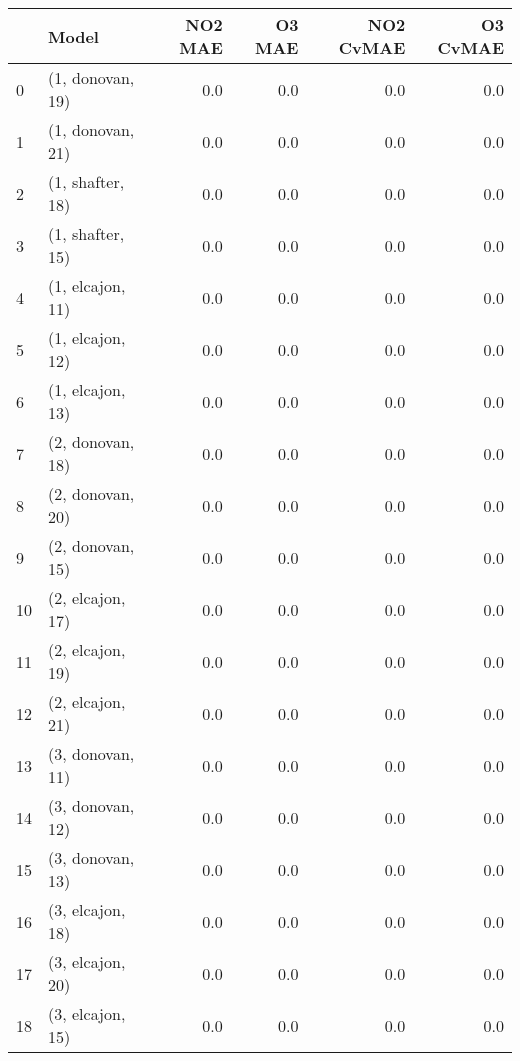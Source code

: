 \begin{tabular}{llrrrr}
\toprule
{} &             Model &  NO2 MAE &  O3 MAE &  NO2 CvMAE &  O3 CvMAE \\
\midrule
0  &  (1, donovan, 19) &      0.0 &     0.0 &        0.0 &       0.0 \\
1  &  (1, donovan, 21) &      0.0 &     0.0 &        0.0 &       0.0 \\
2  &  (1, shafter, 18) &      0.0 &     0.0 &        0.0 &       0.0 \\
3  &  (1, shafter, 15) &      0.0 &     0.0 &        0.0 &       0.0 \\
4  &  (1, elcajon, 11) &      0.0 &     0.0 &        0.0 &       0.0 \\
5  &  (1, elcajon, 12) &      0.0 &     0.0 &        0.0 &       0.0 \\
6  &  (1, elcajon, 13) &      0.0 &     0.0 &        0.0 &       0.0 \\
7  &  (2, donovan, 18) &      0.0 &     0.0 &        0.0 &       0.0 \\
8  &  (2, donovan, 20) &      0.0 &     0.0 &        0.0 &       0.0 \\
9  &  (2, donovan, 15) &      0.0 &     0.0 &        0.0 &       0.0 \\
10 &  (2, elcajon, 17) &      0.0 &     0.0 &        0.0 &       0.0 \\
11 &  (2, elcajon, 19) &      0.0 &     0.0 &        0.0 &       0.0 \\
12 &  (2, elcajon, 21) &      0.0 &     0.0 &        0.0 &       0.0 \\
13 &  (3, donovan, 11) &      0.0 &     0.0 &        0.0 &       0.0 \\
14 &  (3, donovan, 12) &      0.0 &     0.0 &        0.0 &       0.0 \\
15 &  (3, donovan, 13) &      0.0 &     0.0 &        0.0 &       0.0 \\
16 &  (3, elcajon, 18) &      0.0 &     0.0 &        0.0 &       0.0 \\
17 &  (3, elcajon, 20) &      0.0 &     0.0 &        0.0 &       0.0 \\
18 &  (3, elcajon, 15) &      0.0 &     0.0 &        0.0 &       0.0 \\
\bottomrule
\end{tabular}

